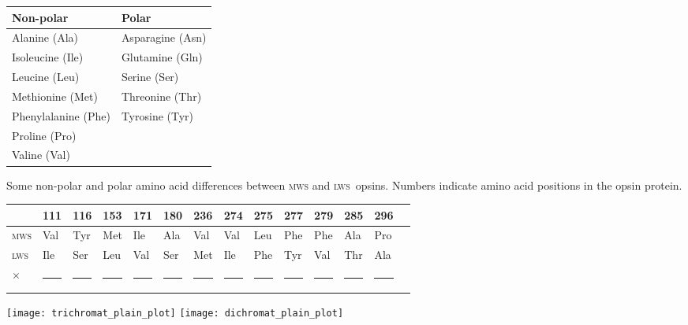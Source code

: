 \documentclass[12pt, addpoints]{exam}
\newcommand{\mws}{\textsc{mws}}
\newcommand{\lws}{\textsc{lws}}
\begin{document}
\begin{questions}
\begin{threeparttable}[t]
\captionsetup{type=table, position=top,skip=0pt}
\label{tab:amino_acid_properties}
\begin{tabular}{@{}ll@{}}
\toprule
Non-polar 			& Polar \tabularnewline
\midrule
Alanine (Ala) 		& Asparagine (Asn)	\tabularnewline
Isoleucine (Ile)	& Glutamine	(Gln)	\tabularnewline
Leucine	(Leu)		& Serine (Ser)		\tabularnewline
Methionine (Met)	& Threonine (Thr)	\tabularnewline
Phenylalanine (Phe)	& Tyrosine (Tyr)	\tabularnewline
Proline	(Pro)		&					\tabularnewline
Valine (Val)		&					\tabularnewline
\bottomrule
\end{tabular}\par
\end{threeparttable}\par

\bigskip

\begin{threeparttable}
\caption{Some non-polar and polar amino acid differences between \mws{} and \lws{}~opsins. Numbers indicate amino acid positions in the opsin protein.}\label{tab:amino_acid_diffs}
\begin{tabular}{@{}*{14}{l}@{}}
\toprule
 & 111 & 116 & 153 & 171 & 180 & 236 & 274 & 275 & 277 & 279 & 285 & 296 \tabularnewline
\midrule
\textsc{mws} & Val & Tyr & Met & Ile & Ala & Val & Val & Leu & Phe & Phe & Ala & Pro \tabularnewline
\textsc{lws} & Ile & Ser & Leu & Val & Ser & Met & Ile & Phe & Tyr & Val & Thr & Ala \tabularnewline
\midrule\noalign{\medskip}
 {\Large $\times$} 	   & \rule{0.5cm}{0.4pt}
 & \rule{0.5cm}{0.4pt} & \rule{0.5cm}{0.4pt}
 & \rule{0.5cm}{0.4pt} & \ifprintanswers{\large $\times$}\else\rule{0.5cm}{0.4pt}\fi
 & \rule{0.5cm}{0.4pt} & \rule{0.5cm}{0.4pt} 
 & \rule{0.5cm}{0.4pt} & \ifprintanswers{\large $\times$}\else\rule{0.5cm}{0.4pt}\fi 
 & \rule{0.5cm}{0.4pt} & \ifprintanswers{\large $\times$}\else\rule{0.5cm}{0.4pt}\fi  
 & \rule{0.5cm}{0.4pt} \tabularnewline
\bottomrule
\end{tabular}
\end{threeparttable}

\bigskip

 
\parbox{\linewidth}{
\ifprintanswers
	\texttt{[image: trichromat\_plain\_plot]}
\else
	\texttt{[image: dichromat\_plain\_plot]}
\fi
{}\label{fig:relative_sensitivity}\par
}



\end{questions}
\end{document}
